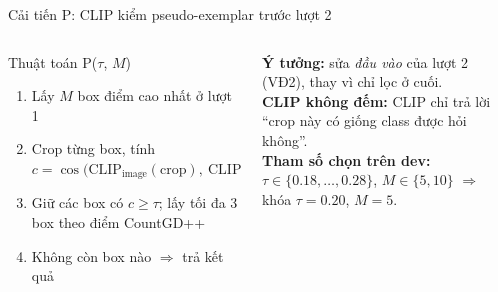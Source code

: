 \documentclass[aspectratio=169,10pt]{beamer}
\gdef\currentsource{}
\newcommand{\source}[1]{\gdef\currentsource{#1}}
\begin{document}
\begin{frame}{Cải tiến P: CLIP kiểm pseudo-exemplar trước lượt 2}
\source{CLIP ViT-B/32 (Radford và cs., ICML 2021), revision cố định}
\begin{columns}[T]
\begin{column}{0.52\textwidth}
\begin{block}{Thuật toán P($\tau$, $M$)}
\small
\begin{enumerate}
\item Lấy $M$ box điểm cao nhất ở lượt 1
\item Crop từng box, tính $c=\cos\bigl(\text{CLIP}_{\text{image}}(\text{crop}),\ \text{CLIP}_{\text{text}}(\text{``a photo of }t\text{''})\bigr)$
\item Giữ các box có $c \ge \tau$; lấy tối đa 3 box theo điểm CountGD++
\item Không còn box nào $\Rightarrow$ trả kết quả \Bzero
\end{enumerate}
\end{block}
\end{column}
\begin{column}{0.44\textwidth}
\textbf{Ý tưởng:} sửa \emph{đầu vào} của lượt 2 (VĐ2), thay vì chỉ lọc ở cuối.\\[2mm]
\textbf{CLIP không đếm:} CLIP chỉ trả lời ``crop này có giống class được hỏi không''.\\[2mm]
\textbf{Tham số chọn trên dev:} $\tau\in\{0.18,\dots,0.28\}$, $M\in\{5,10\}$ $\Rightarrow$ khóa $\tau=0.20$, $M=5$.
\end{column}
\end{columns}
\end{frame}
\end{document}
